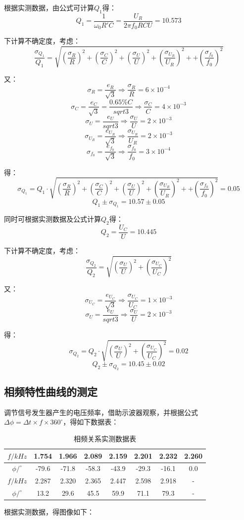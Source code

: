 \documentclass{ctexart}
\begin{document}
根据实测数据，由公式可计算$Q_1$得：
$$Q_1=\frac{1}{\omega_0R'C}=\frac{U_R}{2\pi f_0 R C U}=10.573$$

下计算不确定度，考虑：
$$\frac{\sigma_{Q_1}}{Q_1}=\sqrt{(\frac{\sigma_R}{R})^2+(\frac{\sigma_C}{C})^2+(\frac{\sigma_U}{U})^2+(\frac{\sigma_{U_R}}{U_R})^2++(\frac{\sigma_{f_0}}{f_0})^2}$$

又：
$$\sigma_R=\frac{e_R}{\sqrt{3}}\Rightarrow \frac{\sigma_R}{R}=6\times 10^{-4}$$
$$\sigma_C=\frac{e_C}{\sqrt{3}}=\frac{0.65\%C}{sqrt{3}}\Rightarrow\frac{\sigma_C}{C}=4\times10^{-3}$$
$$\sigma_U=\frac{e_U}{sqrt{3}}\Rightarrow\frac{\sigma_U}{U}=2\times10^{-3}$$
$$\sigma_{U_R}=\frac{e_{U_R}}{\sqrt{3}}\Rightarrow\frac{\sigma_{U_R}}{U_R}=2\times10^{-3}$$
$$\sigma_{f_0}=\frac{e_{f_0}}{\sqrt{3}}\Rightarrow\frac{\sigma_{f_0}}{f_0}=3\times10^{-4}$$

得：$$\sigma_{Q_1}=Q_1\cdot\sqrt{(\frac{\sigma_R}{R})^2+(\frac{\sigma_C}{C})^2+(\frac{\sigma_U}{U})^2+(\frac{\sigma_{U_R}}{U_R})^2++(\frac{\sigma_{f_0}}{f_0})^2}=0.05$$
$$Q_1\pm\sigma_{Q_1}=10.57\pm0.05$$

同时可根据实测数据及公式计算$Q_2$得：
$$Q_2=\frac{U_C}{U}=10.445$$

下计算不确定度，考虑：
$$\frac{\sigma_{Q_2}}{Q_2}=\sqrt{(\frac{\sigma_U}{U})^2+(\frac{\sigma_{U_C}}{U_C})^2}$$

又：
$$\sigma_{U_C}=\frac{e_{U_C}}{\sqrt{3}}\Rightarrow\frac{\sigma_{U_C}}{U_C}=1\times10^{-3}$$
$$\sigma_U=\frac{e_U}{sqrt{3}}\Rightarrow\frac{\sigma_U}{U}=2\times10^{-3}$$

得：
$$\sigma_{Q_2}=Q_2\cdot\sqrt{(\frac{\sigma_U}{U})^2+(\frac{\sigma_{U_C}}{U_C})^2}=0.02$$
$$Q_2\pm\sigma_{Q_2}=10.45\pm0.02$$
\subsection{相频特性曲线的测定}
调节信号发生器产生的电压频率，借助示波器观察，并根据公式$\Delta \phi = \Delta t \times f \times 360^\circ$，得如下数据表：
\begin{table}[H]
  \centering
  \caption{相频关系实测数据表}
    \begin{tabular}{|c|c|c|c|c|c|c|c|}\hline
    $f/kHz$ & 1.754 & 1.966 & 2.089 & 2.159 & 2.201 & 2.232 & 2.260 \\\hline
    $\phi/^\circ$ & -79.6 & -71.8 & -58.3 & -43.9 & -29.3 & -16.1 & 0.0 \\\hline
    $f/kHz$ & 2.287 & 2.320 & 2.365 & 2.447 & 2.598 & 2.918 & - \\\hline
    $\phi/^\circ$ & 13.2  & 29.6  & 45.5  & 59.9  & 71.1  & 79.3  &-  \\\hline
    \end{tabular}%
  \label{tab:addlabel}%
\end{table}%
根据实测数据，得图像如下：
\end{document}
